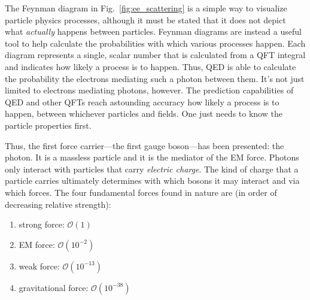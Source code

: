 The Feynman diagram in Fig.~\ref{fig:ee_scattering} is a simple way to visualize particle physics processes, although it must be stated that it does not depict what \emph{actually} happens between particles.
Feynman diagrams are instead a useful tool to help calculate the probabilities with which various processes happen.
Each diagram represents a single, scalar number that is calculated from a QFT integral and indicates how likely a process is to happen.
Thus, QED is able to calculate the probability the electrons mediating such a photon between them. 
It's not just limited to electrons mediating photons, however.
The prediction capabilities of QED and other QFTs reach astounding accuracy how likely a process is to happen, between whichever particles and fields. 
One just needs to know the particle properties first.

Thus, the first force carrier---the first gauge boson---has been presented: the photon.
It is a massless particle and it is the mediator of the EM force. 
Photons only interact with particles that carry \emph{electric charge}.
The kind of charge that a particle carries ultimately determines with which bosons it may interact and via which forces.
The four fundamental forces found in nature are (in order of decreasing relative strength):
\begin{enumerate}
    \item strong force: $\mathcal{O}(1)$
    \item EM force: $\mathcal{O}(10^{-2})$
    \item weak force: $\mathcal{O}(10^{-13})$
    \item gravitational force: $\mathcal{O}(10^{-38})$
\end{enumerate}

